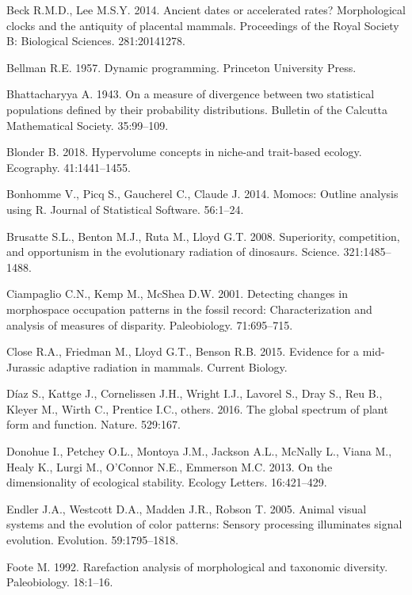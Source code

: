 \documentclass[]{article}
\begin{document}
\hypertarget{ref-beck2014}{}
Beck R.M.D., Lee M.S.Y. 2014. Ancient dates or accelerated rates?
Morphological clocks and the antiquity of placental mammals. Proceedings
of the Royal Society B: Biological Sciences. 281:20141278.

\hypertarget{ref-cursedimensionality}{}
Bellman R.E. 1957. Dynamic programming. Princeton University Press.

\hypertarget{ref-bhattacharyya1943}{}
Bhattacharyya A. 1943. On a measure of divergence between two
statistical populations defined by their probability distributions.
Bulletin of the Calcutta Mathematical Society. 35:99--109.

\hypertarget{ref-blonder2018}{}
Blonder B. 2018. Hypervolume concepts in niche-and trait-based ecology.
Ecography. 41:1441--1455.

\hypertarget{ref-momocs}{}
Bonhomme V., Picq S., Gaucherel C., Claude J. 2014. Momocs: Outline
analysis using R. Journal of Statistical Software. 56:1--24.

\hypertarget{ref-brusatte2008}{}
Brusatte S.L., Benton M.J., Ruta M., Lloyd G.T. 2008. Superiority,
competition, and opportunism in the evolutionary radiation of dinosaurs.
Science. 321:1485--1488.

\hypertarget{ref-ciampaglio2001}{}
Ciampaglio C.N., Kemp M., McShea D.W. 2001. Detecting changes in
morphospace occupation patterns in the fossil record: Characterization
and analysis of measures of disparity. Paleobiology. 71:695--715.

\hypertarget{ref-close2015}{}
Close R.A., Friedman M., Lloyd G.T., Benson R.B. 2015. Evidence for a
mid-Jurassic adaptive radiation in mammals. Current Biology.

\hypertarget{ref-diaz2016}{}
Díaz S., Kattge J., Cornelissen J.H., Wright I.J., Lavorel S., Dray S.,
Reu B., Kleyer M., Wirth C., Prentice I.C., others. 2016. The global
spectrum of plant form and function. Nature. 529:167.

\hypertarget{ref-donohue2013}{}
Donohue I., Petchey O.L., Montoya J.M., Jackson A.L., McNally L., Viana
M., Healy K., Lurgi M., O'Connor N.E., Emmerson M.C. 2013. On the
dimensionality of ecological stability. Ecology Letters. 16:421--429.

\hypertarget{ref-endler2005}{}
Endler J.A., Westcott D.A., Madden J.R., Robson T. 2005. Animal visual
systems and the evolution of color patterns: Sensory processing
illuminates signal evolution. Evolution. 59:1795--1818.

\hypertarget{ref-foote1992}{}
Foote M. 1992. Rarefaction analysis of morphological and taxonomic
diversity. Paleobiology. 18:1--16.
\end{document}
